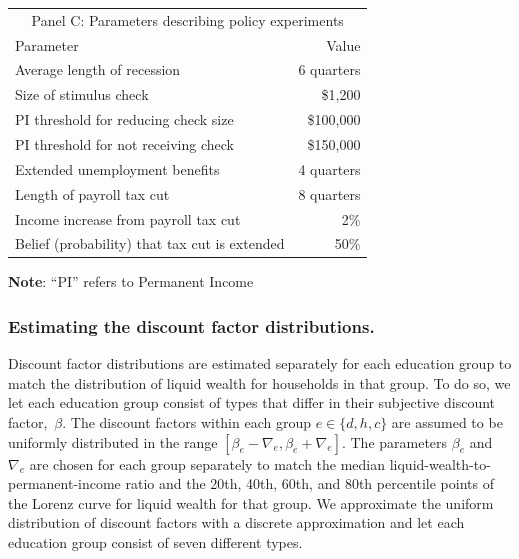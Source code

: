 \documentclass[qe,draft]{econsocart}
\theoremstyle{plain}
\theoremstyle{definition}
\begin{document}
\begin{table}[tb]
  \begin{tabular*}
    {\textwidth}{@{\extracolsep{\fill}}lr@{}}
    \multicolumn{2}{c}{\small Panel C: Parameters describing policy experiments} \\
    \addlinespace
    \hline
    Parameter                                        & Value \\ \hline
    Average length of recession                      & 6 quarters \\
    Size of stimulus check                           & \$1,200 \\
    PI threshold for reducing check size             & \$100,000 \\
    PI threshold for not receiving check             & \$150,000 \\
    Extended unemployment benefits                   & 4 quarters \\
    Length of payroll tax cut                        & 8 quarters \\
    Income increase from payroll tax cut             & 2\% \\
    Belief (probability) that tax cut is extended    & 50\% \\
    \hline
  \end{tabular*}

  \vspace{0.5em}
  \noindent\parbox{\textwidth}{\footnotesize
    \textbf{Note}: ``PI'' refers to Permanent Income}
  \vspace{0.5em}
\end{table}


\subsubsection{Estimating the discount factor distributions.}
\label{sec:estimBetas}

Discount factor distributions are estimated separately for each education group to match the distribution of liquid wealth for households in that group.
To do so, we let each education group consist of types that differ in their subjective discount factor,~$\beta$.
The discount factors within each group $e\in \{d, h, c\}$ are assumed to be uniformly distributed in the range $[\beta_e-\nabla_e, \beta_e+\nabla_e]$.
The parameters $\beta_e$ and $\nabla_e$ are chosen for each group separately to match the median liquid-wealth-to-permanent-income ratio and the 20th, 40th, 60th, and 80th percentile points of the Lorenz curve for liquid wealth for that group.
We approximate the uniform distribution of discount factors with a discrete approximation and let each education group consist of seven different types.
\end{document}
